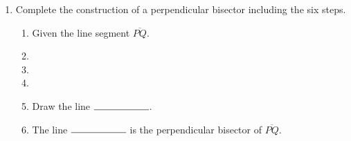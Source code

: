 \begin{enumerate}
\newpage
\item Complete the construction of a perpendicular bisector including the six steps.
  \begin{enumerate}
    \item Given the line segment $\overline{PQ}$.
    \bigskip
    \item %
    \bigskip
    \item %
    \bigskip
    \item %
    \bigskip
    \item Draw the line $\rule{2cm}{0.15mm}$.
    \bigskip
    \item The line $\rule{2cm}{0.15mm}$ is the perpendicular bisector of $\overline{PQ}$.
  \end{enumerate}
  \vspace{7cm}
  \begin{center}
  \end{center}


\end{enumerate}
